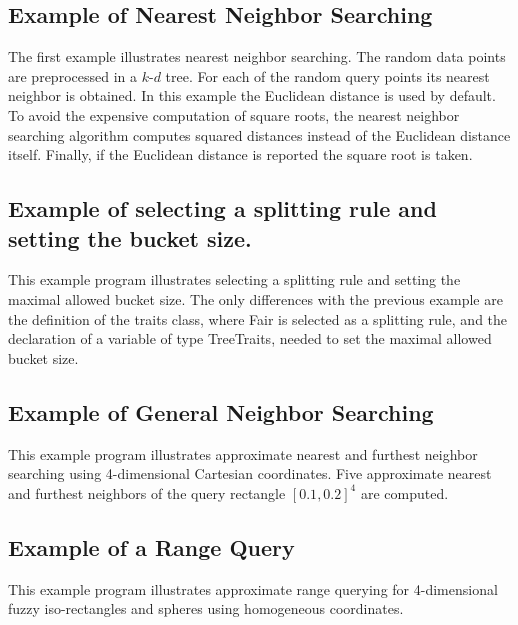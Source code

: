 \subsection{Example of Nearest Neighbor Searching}

The first example illustrates nearest neighbor searching. The random
data points are preprocessed in a $k$-$d$ tree. For each of the random
query points its nearest neighbor is obtained.  In this example the
Euclidean distance is used by default. To avoid the expensive
computation of square roots, the nearest neighbor searching algorithm
computes squared distances instead of the Euclidean distance itself.
Finally, if the Euclidean distance is reported the square root is
taken.


\subsection{Example of selecting a splitting rule and setting the bucket size.}

This example program illustrates selecting a splitting rule and
setting the maximal allowed bucket size.  The only differences with
the previous example are the definition of the traits class, where
Fair is selected as a splitting rule, and the declaration of a
variable  of type TreeTraits, needed to set the maximal
allowed bucket size.


\subsection{Example of General Neighbor Searching}

This example program illustrates approximate nearest and furthest
neighbor searching using 4-dimensional Cartesian coordinates.  Five
approximate nearest and furthest neighbors of the query rectangle
$[0.1,0.2]^4$ are computed.
 

\subsection{Example of a Range Query}

This example program illustrates approximate range querying for
4-dimensional fuzzy iso-rectangles and spheres using homogeneous
coordinates.

